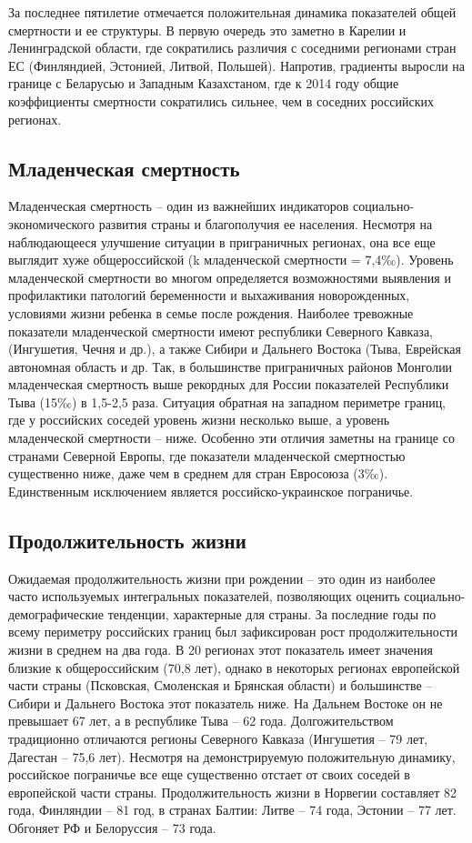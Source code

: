 \documentclass[]{book}
\begin{document}
За последнее пятилетие отмечается положительная динамика показателей
общей смертности и ее структуры. В первую очередь это заметно в Карелии
и Ленинградской области, где сократились различия с соседними регионами
стран ЕС (Финляндией, Эстонией, Литвой, Польшей). Напротив, градиенты
выросли на границе с Беларусью и Западным Казахстаном, где к 2014 году
общие коэффициенты смертности сократились сильнее, чем в соседних
российских регионах.

\subsection{Младенческая смертность}\label{demo-situ-bab}

Младенческая смертность -- один из важнейших индикаторов
социально-экономического развития страны и благополучия ее населения.
Несмотря на наблюдающееся улучшение ситуации в приграничных регионах,
она все еще выглядит хуже общероссийской (k младенческой смертности =
7,4‰). Уровень младенческой смертности во многом определяется
возможностями выявления и профилактики патологий беременности и
выхаживания новорожденных, условиями жизни ребенка в семье после
рождения. Наиболее тревожные показатели младенческой смертности имеют
республики Северного Кавказа, (Ингушетия, Чечня и др.), а также Сибири и
Дальнего Востока (Тыва, Еврейская автономная область и др. Так, в
большинстве приграничных районов Монголии младенческая смертность выше
рекордных для России показателей Республики Тыва (15‰) в 1,5-2,5 раза.
Ситуация обратная на западном периметре границ, где у российских соседей
уровень жизни несколько выше, а уровень младенческой смертности -- ниже.
Особенно эти отличия заметны на границе со странами Северной Европы, где
показатели младенческой смертностью существенно ниже, даже чем в среднем
для стран Евросоюза (3‰). Единственным исключением является
российско-украинское пограничье.

\subsection{Продолжительность жизни}\label{demo-situ-long}

Ожидаемая продолжительность жизни при рождении -- это один из наиболее
часто используемых интегральных показателей, позволяющих оценить
социально-демографические тенденции, характерные для страны. За
последние годы по всему периметру российских границ был зафиксирован
рост продолжительности жизни в среднем на два года. В 20 регионах этот
показатель имеет значения близкие к общероссийским (70,8 лет), однако в
некоторых регионах европейской части страны (Псковская, Смоленская и
Брянская области) и большинстве -- Сибири и Дальнего Востока этот
показатель ниже. На Дальнем Востоке он не превышает 67 лет, а в
республике Тыва -- 62 года. Долгожительством традиционно отличаются
регионы Северного Кавказа (Ингушетия -- 79 лет, Дагестан -- 75,6 лет).
Несмотря на демонстрируемую положительную динамику, российское
пограничье все еще существенно отстает от своих соседей в европейской
части страны. Продолжительность жизни в Норвегии составляет 82 года,
Финляндии -- 81 год, в странах Балтии: Литве -- 74 года, Эстонии -- 77
лет. Обгоняет РФ и Белоруссия -- 73 года.
\end{document}

